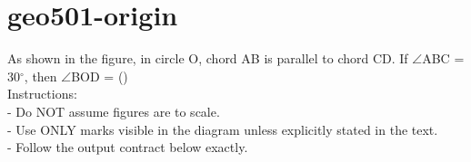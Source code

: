 \documentclass[12pt]{article}
\begin{document}
\section*{geo501-origin}
\noindent\begin{minipage}{\textwidth}
\setlength{\parskip}{4pt}
As shown in the figure, in circle O, chord AB is parallel to chord CD. If \ensuremath{\angle }ABC = 30\ensuremath{^\circ}, then \ensuremath{\angle }BOD = ()\\
Instructions:\\
- Do NOT assume figures are to scale.\\
- Use ONLY marks visible in the diagram unless explicitly stated in the text.\\
- Follow the output contract below exactly.\\
\end{minipage}
\end{document}
